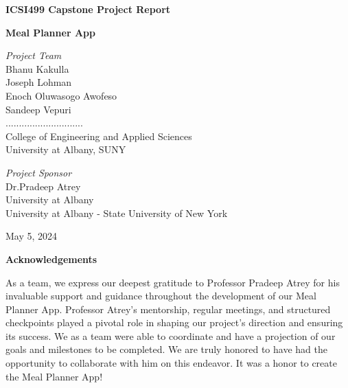 \documentclass[12pt]{article}
\begin{document}

\begin{titlepage}
	\clearpage\thispagestyle{empty}
	\centering
	\vspace{1.5cm}
   {\normalsize
    \textbf{ICSI499 Capstone Project Report} \par
}
  	\vspace{1.5cm}
	{\Huge \textbf{Meal Planner App}} \\
	\vspace{3cm}
	{\normalsize \textit{Project Team}\\
		\vspace{0.25cm}
	Bhanu Kakulla   \\ %
    Joseph Lohman	 \\
    Enoch Oluwasogo Awofeso	 \\
    Sandeep Vepuri	 \\
	............................. \\
	College of Engineering and Applied Sciences\\
	University at Albany, SUNY \par}
	\vspace{4cm}
 
    {\normalsize
    \textit{Project Sponsor}\\
    		\vspace{0.25cm}
    Dr.Pradeep Atrey  \\
    University at Albany \\
    University at Albany - State University of New York \par
}

 
    \vspace{3cm}
		
	{\normalsize May 5, 2024 \par}
	
	\pagebreak


\end{titlepage}
	
\clearpage\thispagestyle{empty}

	\vspace{1cm}
		\begin{center}
\textbf{Acknowledgements}\\
		\end{center}
	\vspace{1cm}
{\normalsize As a team, we express our deepest gratitude to Professor Pradeep Atrey for his invaluable support and guidance throughout the development of our Meal Planner App. Professor Atrey's mentorship, regular meetings, and structured checkpoints played a pivotal role in shaping our project's direction and ensuring its success. We as a team were able to coordinate and have a projection of our goals and milestones to be completed. We are truly honored to have had the opportunity to collaborate with him on this endeavor. It was a honor to create the Meal Planner App!
\par}
\end{document}
